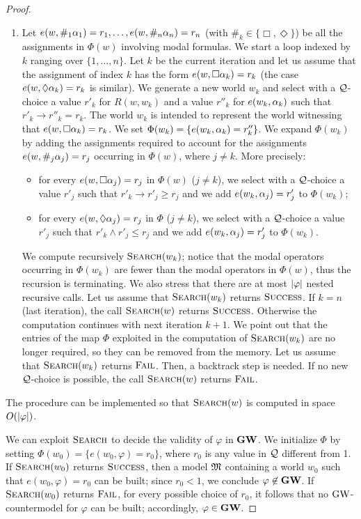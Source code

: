 \begin{proof}
\begin{enumerate}[label*=(Step~\arabic*)]
\item\label{step:2} Let $e(w,\#_1\alpha_1)=r_1,\dots,e(w,\#_n\alpha_n)=r_n$
  (with $\#_k\in\{\Box,\Diamond\}$) be all the assignments in $\Phi(w)$
  involving modal formulas.  We start a loop indexed by $k$ ranging
  over $\{1,\dots,n\}$.  Let $k$ be the current iteration and let us
  assume that the assignment of index $k$ has the form
  $e(w,\Box\alpha_k)=r_k$ (the case $e(w,\lozenge\alpha_k)=r_k$ is similar).  We
  generate a new world $w_k$ and select with a $\mathcal{Q}$-choice a value
  $r'_k$ for $R(w,w_k)$ and a value $r''_k$ for $e(w_k,\alpha_k)$ such
  that $r'_k\to r''_k = r_k$. The world $w_k$ is intended to represent
  the world witnessing that $e(w,\Box\alpha_k)=r_k$. We set
  $\Phi(w_k)=\{e(w_k,\alpha_k)=r''_k\}$.  We expand $\Phi(w_k)$ by adding
  the assignments required to account for the assignments
  $e(w,\#_j\alpha_j)=r_j$ occurring in $\Phi(w)$, where $j\neq k$. More
  precisely:
  \begin{itemize}
  \item for every $e(w,\Box \alpha_j)=r_j$ in $\Phi(w)$ ($j\neq k$), we
    select with a $\mathcal{Q}$-choice a value $r'_j$ such that $r'_k \to
    r'_j \geq r_j$ and we add $e(w_k,\alpha_j)=r'_j$ to $\Phi(w_k)$;
    

  \item for every $e(w,\lozenge \alpha_j)=r_j$ in $\Phi$ ($j\neq k$), we
    select with a $\mathcal{Q}$-choice a value $r'_j$ such that $r'_k \land
    r'_j \leq r_j$ and we add $e(w_k,\alpha_j)=r'_j$ to $\Phi(w_k)$.
  \end{itemize}
  We compute recursively $\textsc{Search}(w_k)$; notice that the modal
  operators occurring in $\Phi(w_k)$ are fewer than the modal
  operators in $\Phi(w)$, thus the recursion is terminating. We also
  stress that there are at most $|\varphi|$ nested recursive calls.
  Let us assume that $\textsc{Search}(w_k)$ returns $\textsc{Success}$.  If $k=n$
  (last iteration), the call $\textsc{Search}(w)$ returns $\textsc{Success}$.
  Otherwise the computation continues with next iteration $k+1$.  We
  point out that the entries of the map $\Phi$ exploited in the
  computation of $\textsc{Search}(w_k)$ are no longer required, so they can be
  removed from the memory.  Let us assume that $\textsc{Search}(w_k)$ returns
  $\textsc{Fail}$.  Then, a backtrack step is needed.  If no new
  $\mathcal{Q}$-choice is possible, the call $\textsc{Search}(w)$ returns $\textsc{Fail}$.
\end{enumerate}
The procedure can be implemented so that $\textsc{Search}(w)$ is computed in
space $O(|\varphi|)$.

We can exploit $\textsc{Search}$ to decide the validity of $\varphi$ in
$\mathbf{GW}$.  We initialize $\Phi$ by setting $\Phi(w_0)=\{e(w_0,\varphi)=
r_0\}$, where $r_0$ is any value in $\mathcal{Q}$ different from 1.  If
$\textsc{Search}(w_0)$ returns $\textsc{Success}$, then a model $\mathfrak{M}$ containing a
world $w_0$ such that $e(w_0,\varphi)=r_0$ can be built; since $r_0 <
1$, we conclude $\varphi\not\in \mathbf{GW}$.  If $\textsc{Search}(w_0)$ returns
$\textsc{Fail}$, for every possible choice of $r_0$, it follows that no
$\mbox{$\mathrm{GW}$}$-countermodel for $\varphi$ can be built; accordingly,
$\varphi\in \mathbf{GW}$.
\end{proof}









